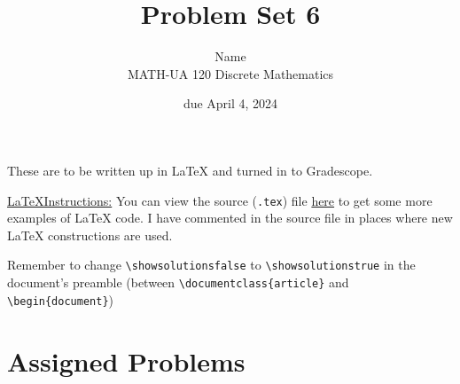 \documentclass{article}
\title{Problem Set 6}
\author{%
    Name
\\  MATH-UA 120 Discrete Mathematics
}
\date{due April 4, 2024}
\newif\ifshowsolutions
\newcommand{\danger}{\marginpar[\hfill\dbend]{\dbend\hfill}}
\theoremstyle{definition}
\begin{document}
\maketitle



These are to be written up in \LaTeX{} and turned in to Gradescope.



\ifshowsolutions
    \SetupExSheets{solution/print=true}
\else
    \danger
 \underline{ \LaTeX  Instructions:}  You can view the source (\texttt{.tex}) file \href{https://bit.ly/4cCEb3d}{here} to get some more examples of \LaTeX{} code.  I have commented in the source file in places where new \LaTeX{} constructions are used.
  
  Remember to change \verb|\showsolutionsfalse| to \verb|\showsolutionstrue|
    in the document's preamble 
    (between \verb|\documentclass{article}| and \verb|\begin{document}|)
\fi

\section*{Assigned Problems}
\end{document}
